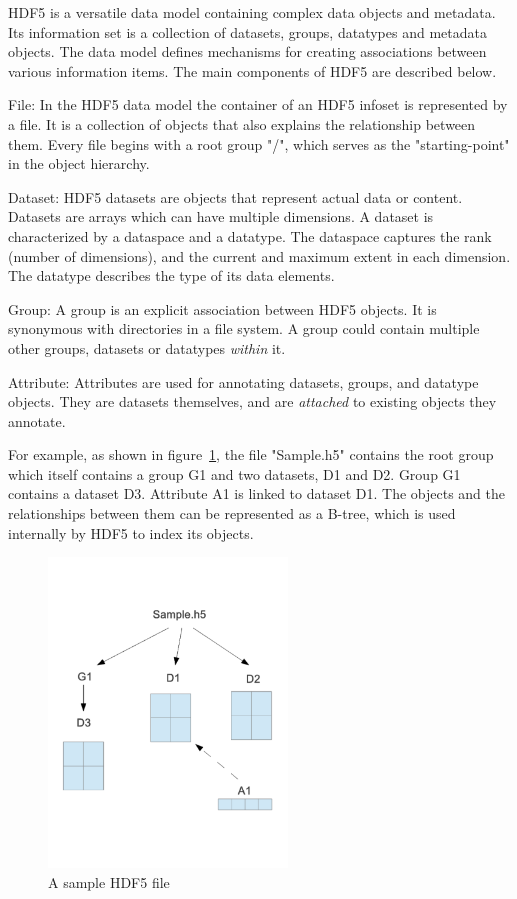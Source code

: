 HDF5 is a versatile data model containing complex data objects and metadata. 
Its information set is a collection of datasets, groups, datatypes and metadata objects. The data model defines mechanisms for creating associations between various information items. The main components of HDF5 are described below.

File:
In the HDF5 data model the container of an HDF5 infoset
is represented by a file. It is a collection of objects that also explains the relationship between them.
Every file begins with a root group "/", which serves as the "starting-point" in the object hierarchy. 

Dataset:
HDF5 datasets are objects that represent actual data or content. Datasets are arrays which can have multiple dimensions. A dataset is characterized by a dataspace and a datatype. The dataspace captures the rank (number of dimensions), and the current and maximum extent in each dimension. The datatype describes the type of its data elements. 

Group:
A group is an explicit association between HDF5 objects. It is synonymous with directories in a file system. A group could contain multiple other groups, datasets or datatypes \textit{within} it. 

Attribute:
Attributes are used for annotating datasets, groups, and datatype objects. They are datasets themselves, and are \textit{attached} to existing objects they annotate. 

For example, as shown in figure~\ref{hdf5_example}, the file "Sample.h5" contains the root group which itself contains a group G1 and two datasets, D1 and D2. Group G1 contains a dataset D3. Attribute A1 is linked to dataset D1. The objects and the relationships between them can be represented as a B-tree, which is used internally by HDF5 to index its objects. 

\begin{figure}[!t]
\centering
\includegraphics[width=2.5in]{hdf5_example}
\caption{A sample HDF5 file}
\label{hdf5_example}
\end{figure}

